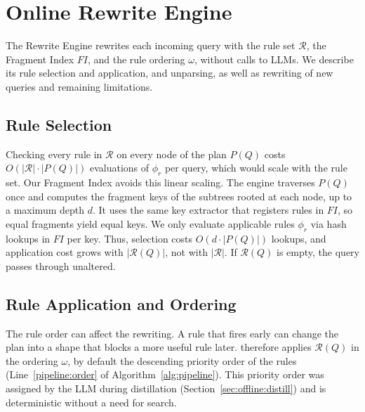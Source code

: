 \section{Online Rewrite Engine}
\label{sec:query_rewriting}
The Rewrite Engine rewrites each incoming query with the rule set $\mathcal{R}$, the Fragment Index $\mathit{FI}$, and the rule ordering $\omega$, without calls to LLMs.
We describe its rule selection and application, and unparsing, as well as rewriting of new queries and remaining limitations.

\vspace{-0.25cm}
\subsection{Rule Selection}
\label{sec:online:fragment}
Checking every rule in $\mathcal{R}$ on every node of the plan $P(Q)$ costs $O(|\mathcal{R}| \cdot |P(Q)|)$ evaluations of $\phi_r$ per query, which would scale with the rule set. Our Fragment Index avoids this linear scaling. The engine traverses $P(Q)$ once and computes the fragment keys of the subtrees rooted at each node, up to a maximum depth $d$. It uses the same key extractor that registers rules in $\mathit{FI}$, so equal fragments yield equal keys. We only evaluate applicable rules $\phi_r$ via hash lookups in $\mathit{FI}$ per key. Thus, selection costs $O(d \cdot |P(Q)|)$ lookups, and application cost grows with $|\mathcal{R}(Q)|$, not with $|\mathcal{R}|$. If $\mathcal{R}(Q)$ is empty, the query passes through unaltered.

\vspace{-0.25cm}
\subsection{Rule Application and Ordering}
\label{sec:online:apply}
The rule order can affect the rewriting. A rule that fires early can change the plan into a shape that blocks a more useful rule later. {\sys} therefore applies $\mathcal{R}(Q)$ in the ordering $\omega$, by default the descending priority order of the rules (Line~\ref{pipeline:order} of Algorithm~\ref{alg:pipeline}). This priority order was assigned by the LLM during distillation (Section~\ref{sec:offline:distill}) and is deterministic without a need for search.

